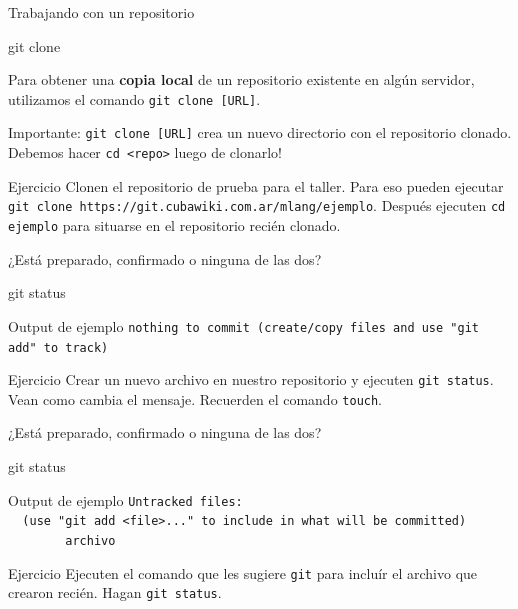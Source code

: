 \begin{frame}[t]{Trabajando con un repositorio}
    \begin{comando}
        git clone
    \end{comando}

    \begin{block}{}
        Para obtener una \textbf{copia local} de un repositorio existente en algún servidor,
        utilizamos el comando \texttt{git clone [URL]}.
    \end{block}
    \begin{block}{}
        Importante: \texttt{git clone [URL]} crea un nuevo directorio con el
        repositorio clonado. Debemos hacer \texttt{cd <repo>} luego de clonarlo!
    \end{block}

    \pause
    \begin{ejercicio}{Ejercicio}
        Clonen el repositorio de prueba para el taller. Para eso pueden ejecutar \texttt{git clone https://git.cubawiki.com.ar/mlang/ejemplo}.
        Después ejecuten \texttt{cd ejemplo} para situarse en el repositorio recién clonado.
    \end{ejercicio}
\end{frame}

\begin{frame}[fragile, t]{¿Está preparado, confirmado o ninguna de las dos?}
    \begin{comando}
        git status
    \end{comando}
        \begin{block}{Output de ejemplo}{}
            \texttt{nothing to commit (create/copy files and use "git add" to track)}
        \end{block}
    \pause
    \begin{ejercicio}{Ejercicio}
        Crear un nuevo archivo en nuestro repositorio y ejecuten \texttt{git status}. Vean como cambia el mensaje. Recuerden el comando \texttt{touch}.
    \end{ejercicio}

\end{frame}
\begin{frame}[fragile, t]{¿Está preparado, confirmado o ninguna de las dos?}
    \begin{comando}
        git status
    \end{comando}
    \begin{block}{Output de ejemplo}{}
        \texttt{Untracked files: \\
                \ \ (use "git add <file>..." to include in what will be committed) \\
                \ \ \ \ \ \ \ \ archivo}
    \end{block}
\begin{ejercicio}{Ejercicio}
    Ejecuten el comando que les sugiere \texttt{git} para incluír el archivo que crearon recién. Hagan \texttt{git status}.
\end{ejercicio}
\end{frame}


